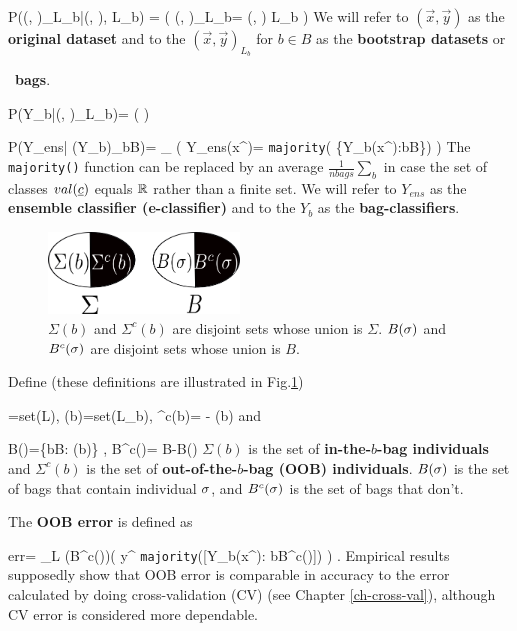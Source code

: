 \beq\color{blue}
P((, )_{L_b}|(, ), L_b)
=
\indi(\;\;\;
(, )_{L_b}= 
(, ) L_b
\;\;\;)
\eeq
We will refer to $(\vec{x}, \vec{y})$ as the
{\bf original dataset} and to
the $(\vec{x}, \vec{y})_{L_b}$
for $b\in B$
as the {\bf bootstrap datasets} or {\ {\bf bags}.

\beq\color{blue}
P(Y_b|(, )_{L_b})=
\indi(\;\;\;
\;\;\;)
\eeq

\beq\color{blue}
P(Y_{ens}| (Y_b)_{b\in B})=
\prod_\s
\indi(
\;\;\;
Y_{ens}(x^\s)=
{\tt majority}(
\{Y_b(x^\s):b\in B\})
\;\;\;)
\eeq
The {\tt majority()}
function can be replaced
by an average $\frac{1}{nbags}\sum_b$
in case
the set of classes $val(\rvc)$
equals ${ \mathbb{R}}$ rather than a finite set.
We will refer to
$Y_{ens}$ as the {\bf ensemble
classifier (e-classifier)}
and to the $Y_b$
as the {\bf bag-classifiers}.


 


\begin{figure}[h!]
\centering
\includegraphics[width=2in]
{ran-forest/ran-forest-sets.png}
\caption
{$\Sigma(b)$ and $\Sigma^c(b)$
are disjoint sets whose union is $\Sigma$.
$B(\sigma)$ and $B^c(\sigma)$ 
are disjoint sets whose union is $B$.
} 
\label{fig-ran-forest-sets}
\end{figure}

Define 
(these definitions
are illustrated  in Fig.\ref{fig-ran-forest-sets})

\beq
\Sigma=set(L)\;,\;\;
\Sigma(b)=set(L_b)\;,\;\;
\Sigma^c(b)= \Sigma - \Sigma(b)
\eeq
and

\beq
B(\s)=\{b\in B: \s\in \Sigma(b)\}
\;,\;\;
B^c(\s)= B-B(\s)
\eeq
$\Sigma(b)$ is
the set of 
{\bf in-the-$b$-bag individuals}
and 
$\Sigma^c(b)$ is
the set of {\bf out-of-the-$b$-bag
 (OOB) individuals}. 
$B(\sigma)$
is the set of bags that
contain individual $\sigma$,
and $B^c(\sigma)$
is the set of bags that don't.

The {\bf OOB error} is defined as


\beq
err= \sum_{\s\in L} 
\indi(B^c(\s)\neq \emptyset)\indi(
\;\;\;y^\s\neq
{\tt majority}([Y_b(x^\s): b\in B^c(\s)])
\;\;\;)
\;.
\eeq
Empirical
results supposedly show that OOB error is comparable in 
accuracy to the error calculated
by doing cross-validation (CV)
 (see Chapter \ref{ch-cross-val}),
although CV error is considered
more dependable.

}
